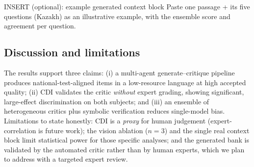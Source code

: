 \documentclass[11pt]{article}
\begin{document}
\begin{figbox}{INSERT (optional): example generated context block}
Paste one passage + its five questions (Kazakh) as an illustrative example,
with the ensemble score and agreement per question.
\end{figbox}

\subsection{Discussion and limitations}
The results support three claims: (i) a multi-agent generate--critique pipeline
produces national-test-aligned items in a low-resource language at high accepted
quality; (ii) CDI validates the critic \emph{without} expert grading, showing
significant, large-effect discrimination on both subjects; and (iii) an ensemble
of heterogeneous critics plus symbolic verification reduces single-model bias.
Limitations to state honestly: CDI is a \emph{proxy} for human judgement
(expert-correlation is future work); the vision ablation ($n=3$) and the single
real context block limit statistical power for those specific analyses; and the
generated bank is validated by the automated critic rather than by human
experts, which we plan to address with a targeted expert review.
\end{document}
